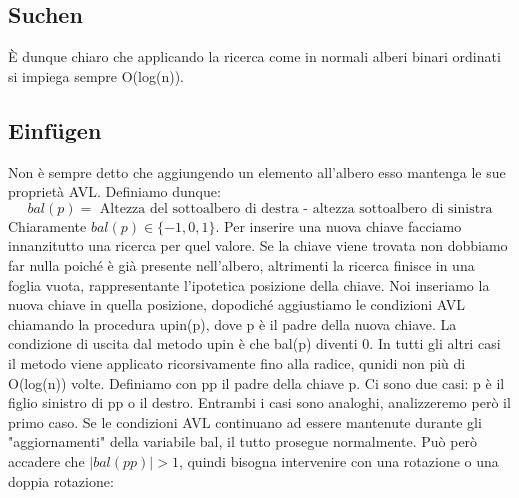 \documentclass[a4paper]{book}
\begin{document}
\subsection*{Suchen}
È dunque chiaro che applicando la ricerca come in normali alberi binari ordinati si impiega sempre O(log(n)).
\subsection*{Einfügen}
Non è sempre detto che aggiungendo un elemento all'albero esso mantenga le sue proprietà AVL. Definiamo dunque:
$$ bal(p)=\mbox{ Altezza del sottoalbero di destra - altezza sottoalbero di sinistra}$$
Chiaramente $bal(p) \in \{-1,0,1\}$. Per inserire una nuova chiave facciamo innanzitutto una ricerca per quel valore. Se la chiave viene trovata non dobbiamo far nulla poiché è già presente nell'albero, altrimenti la ricerca finisce in una foglia vuota, rappresentante l'ipotetica posizione della chiave. Noi inseriamo la nuova chiave in quella posizione, dopodiché aggiustiamo le condizioni AVL chiamando la procedura upin(p), dove p è il padre della nuova chiave. La condizione di uscita dal metodo upin è che bal(p) diventi 0. In tutti gli altri casi il metodo viene applicato ricorsivamente fino alla radice, qunidi non più di O(log(n)) volte. Definiamo con pp il padre della chiave p. Ci sono due casi: p è il figlio sinistro di pp o il destro. Entrambi i casi sono analoghi, analizzeremo però il primo caso. Se le condizioni AVL continuano ad essere mantenute durante gli "aggiornamenti" della variabile bal, il tutto prosegue normalmente. Può però accadere che $|bal(pp)|>1$, quindi bisogna intervenire con una rotazione o una doppia rotazione:
\end{document}

